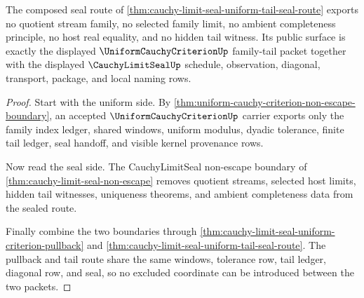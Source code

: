\begin{theorem}
\label{thm:cauchy-limit-seal-family-seal-non-escape}
The composed seal route of
\autoref{thm:cauchy-limit-seal-uniform-tail-seal-route} exports no quotient
stream family, no selected family limit, no ambient completeness principle, no
host real equality, and no hidden tail witness. Its public surface is exactly
the displayed $\UniformCauchyCriterionUp$ family-tail packet together with the
displayed $\CauchyLimitSealUp$ schedule, observation, diagonal, transport,
package, and local naming rows.
\end{theorem}
\begin{proof}
Start with the uniform side. By
\autoref{thm:uniform-cauchy-criterion-non-escape-boundary}, an accepted
$\UniformCauchyCriterionUp$ carrier exports only the family index ledger,
shared windows, uniform modulus, dyadic tolerance, finite tail ledger, seal
handoff, and visible kernel provenance rows.

Now read the seal side. The CauchyLimitSeal non-escape boundary of
\autoref{thm:cauchy-limit-seal-non-escape} removes quotient streams, selected
host limits, hidden tail witnesses, uniqueness theorems, and ambient
completeness data from the sealed route.

Finally combine the two boundaries through
\autoref{thm:cauchy-limit-seal-uniform-criterion-pullback} and
\autoref{thm:cauchy-limit-seal-uniform-tail-seal-route}. The pullback and
tail route share the same windows, tolerance row, tail ledger, diagonal row,
and seal, so no excluded coordinate can be introduced between the two packets.
\end{proof}

